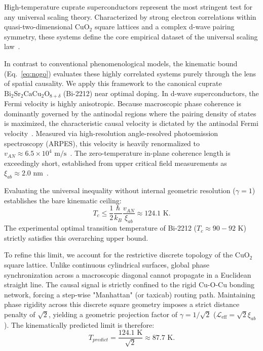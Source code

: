 \documentclass[11pt,a4paper]{article}
\begin{document}
High-temperature cuprate superconductors represent the most stringent test for any universal scaling theory. Characterized by strong electron correlations within quasi-two-dimensional $\text{CuO}_2$ square lattices and a complex d-wave pairing symmetry, these systems define the core empirical dataset of the universal scaling law~\cite{Homes2004}. 

In contrast to conventional phenomenological models, the kinematic bound (Eq.~\eqref{eq:nogo}) evaluates these highly correlated systems purely through the lens of spatial causality. We apply this framework to the canonical cuprate $\text{Bi}_2\text{Sr}_2\text{CaCu}_2\text{O}_{8+\delta}$ (Bi-2212) near optimal doping. In d-wave superconductors, the Fermi velocity is highly anisotropic. Because macroscopic phase coherence is dominantly governed by the antinodal regions where the pairing density of states is maximized, the characteristic causal velocity is dictated by the antinodal Fermi velocity~\cite{Damascelli2003}. Measured via high-resolution angle-resolved photoemission spectroscopy (ARPES), this velocity is heavily renormalized to $v_{AN} \approx 6.5 \times 10^4 \text{ m/s}$~\cite{Vishik2010}. The zero-temperature in-plane coherence length is exceedingly short, established from upper critical field measurements as $\xi_{ab} \approx 2.0 \text{ nm}$~\cite{Poole1999}.

Evaluating the universal inequality without internal geometric resolution ($\gamma = 1$) establishes the bare kinematic ceiling:
\begin{equation}
T_c \le \frac{1}{2}\frac{\hbar}{k_B}\frac{v_{AN}}{\xi_{ab}} \approx 124.1 \text{ K}.
\end{equation}
The experimental optimal transition temperature of Bi-2212 ($T_c \approx 90-92 \text{ K}$)~\cite{Presland1991} strictly satisfies this overarching upper bound.

To refine this limit, we account for the restrictive discrete topology of the $\text{CuO}_2$ square lattice. Unlike continuous cylindrical surfaces, global phase synchronization across a macroscopic diagonal cannot propagate in a Euclidean straight line. The causal signal is strictly confined to the rigid Cu-O-Cu bonding network, forcing a step-wise "Manhattan" (or taxicab) routing path. Maintaining phase rigidity across this discrete square geometry imposes a strict distance penalty of $\sqrt{2}$, yielding a geometric projection factor of $\gamma = 1/\sqrt{2}$ ($\mathcal{L}_{\text{eff}} = \sqrt{2} \xi_{ab}$). The kinematically predicted limit is therefore:
\begin{equation}
T_{predict} = \frac{124.1 \text{ K}}{\sqrt{2}} \approx 87.7 \text{ K}.
\end{equation}
\end{document}
